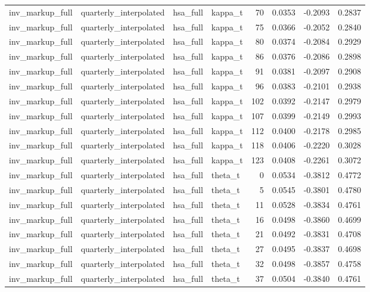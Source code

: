\begin{tabular}{llllrrrr}
inv\_markup\_full & quarterly\_interpolated & hsa\_full & kappa\_t & 70 & 0.0353 & -0.2093 & 0.2837 \\
inv\_markup\_full & quarterly\_interpolated & hsa\_full & kappa\_t & 75 & 0.0366 & -0.2052 & 0.2840 \\
inv\_markup\_full & quarterly\_interpolated & hsa\_full & kappa\_t & 80 & 0.0374 & -0.2084 & 0.2929 \\
inv\_markup\_full & quarterly\_interpolated & hsa\_full & kappa\_t & 86 & 0.0376 & -0.2086 & 0.2898 \\
inv\_markup\_full & quarterly\_interpolated & hsa\_full & kappa\_t & 91 & 0.0381 & -0.2097 & 0.2908 \\
inv\_markup\_full & quarterly\_interpolated & hsa\_full & kappa\_t & 96 & 0.0383 & -0.2101 & 0.2938 \\
inv\_markup\_full & quarterly\_interpolated & hsa\_full & kappa\_t & 102 & 0.0392 & -0.2147 & 0.2979 \\
inv\_markup\_full & quarterly\_interpolated & hsa\_full & kappa\_t & 107 & 0.0399 & -0.2149 & 0.2993 \\
inv\_markup\_full & quarterly\_interpolated & hsa\_full & kappa\_t & 112 & 0.0400 & -0.2178 & 0.2985 \\
inv\_markup\_full & quarterly\_interpolated & hsa\_full & kappa\_t & 118 & 0.0406 & -0.2220 & 0.3028 \\
inv\_markup\_full & quarterly\_interpolated & hsa\_full & kappa\_t & 123 & 0.0408 & -0.2261 & 0.3072 \\
inv\_markup\_full & quarterly\_interpolated & hsa\_full & theta\_t & 0 & 0.0534 & -0.3812 & 0.4772 \\
inv\_markup\_full & quarterly\_interpolated & hsa\_full & theta\_t & 5 & 0.0545 & -0.3801 & 0.4780 \\
inv\_markup\_full & quarterly\_interpolated & hsa\_full & theta\_t & 11 & 0.0528 & -0.3834 & 0.4761 \\
inv\_markup\_full & quarterly\_interpolated & hsa\_full & theta\_t & 16 & 0.0498 & -0.3860 & 0.4699 \\
inv\_markup\_full & quarterly\_interpolated & hsa\_full & theta\_t & 21 & 0.0492 & -0.3831 & 0.4708 \\
inv\_markup\_full & quarterly\_interpolated & hsa\_full & theta\_t & 27 & 0.0495 & -0.3837 & 0.4698 \\
inv\_markup\_full & quarterly\_interpolated & hsa\_full & theta\_t & 32 & 0.0498 & -0.3857 & 0.4758 \\
inv\_markup\_full & quarterly\_interpolated & hsa\_full & theta\_t & 37 & 0.0504 & -0.3840 & 0.4761 \\

\end{tabular}
